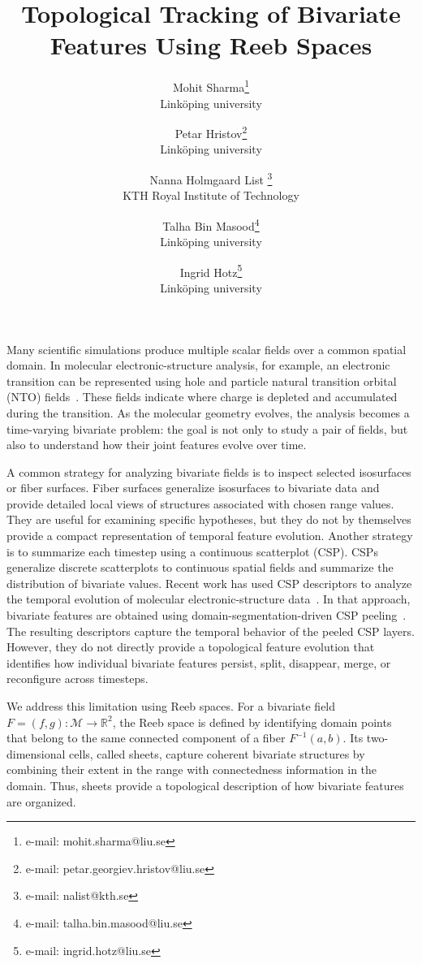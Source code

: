 \documentclass{vgtc}                          %
\title{Topological Tracking of Bivariate Features Using Reeb Spaces}
\author{Mohit Sharma\thanks{e-mail: mohit.sharma@liu.se}\\ %
        \scriptsize Link\"oping university %
\and Petar Hristov\thanks{e-mail: petar.georgiev.hristov@liu.se}\\ %
        \scriptsize Link\"oping university %
\and Nanna Holmgaard List \thanks{e-mail: nalist@kth.se}\\ %
        \scriptsize KTH Royal Institute of Technology %
\and Talha Bin Masood\thanks{e-mail: talha.bin.masood@liu.se}\\ %
        \scriptsize Link\"oping university %
\and Ingrid Hotz\thanks{e-mail: ingrid.hotz@liu.se}\\ %
        \scriptsize Link\"oping university %
}
\newcommand{\R}{\mathbb{R}}
\newcommand{\Domain}{\mathcal{M}}
\begin{document}


\maketitle
Many scientific simulations produce multiple scalar fields over a common spatial domain. In molecular electronic-structure analysis, for example, an electronic transition can be represented using hole and particle natural transition orbital (NTO) fields~\cite{Martin2003NTO}. These fields indicate where charge is depleted and accumulated during the transition. As the molecular geometry evolves, the analysis becomes a time-varying bivariate problem: the goal is not only to study a pair of fields, but also to understand how their joint features evolve over time.

A common strategy for analyzing bivariate fields is to inspect selected isosurfaces or fiber surfaces. Fiber surfaces generalize isosurfaces to bivariate data and provide detailed local views of structures associated with chosen range values. They are useful for examining specific hypotheses, but they do not by themselves provide a compact representation of temporal feature evolution. Another strategy is to summarize each timestep using a continuous scatterplot (CSP). CSPs generalize discrete scatterplots to continuous spatial fields and summarize the distribution of bivariate values. Recent work has used CSP descriptors to analyze the temporal evolution of molecular electronic-structure data~\cite{Sharma2025}. In that approach, bivariate features are obtained using domain-segmentation-driven CSP peeling~\cite{Sharma2021}. The resulting descriptors capture the temporal behavior of the peeled CSP layers. However, they do not directly provide a topological feature evolution that identifies how individual bivariate features persist, split, disappear, merge, or reconfigure across timesteps.

We address this limitation using Reeb spaces. For a bivariate field $F=(f,g):\Domain\rightarrow\R^2$, the Reeb space is defined by identifying domain points that belong to the same connected component of a fiber $F^{-1}(a,b)$. Its two-dimensional cells, called sheets, capture coherent bivariate structures by combining their extent in the range with connectedness information in the domain. Thus, sheets provide a topological description of how bivariate features are organized.
\end{document}
